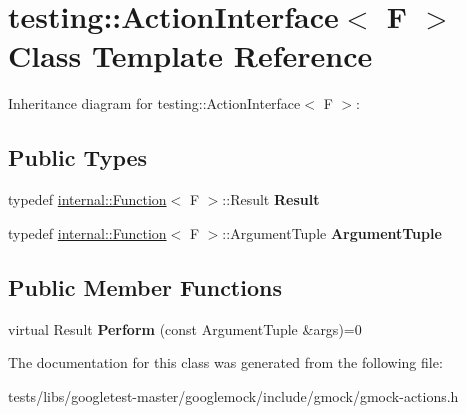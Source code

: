 \hypertarget{classtesting_1_1ActionInterface}{}\section{testing\+:\+:Action\+Interface$<$ F $>$ Class Template Reference}
\label{classtesting_1_1ActionInterface}


Inheritance diagram for testing\+:\+:Action\+Interface$<$ F $>$\+:
\subsection*{Public Types}
\begin{DoxyCompactItemize}
\item 
\mbox{\label{classtesting_1_1ActionInterface_a7477de2fe3e4e01c59db698203acaee7}} 
typedef \hyperlink{structtesting_1_1internal_1_1Function}{internal\+::\+Function}$<$ F $>$\+::Result {\bfseries Result}
\item 
\mbox{\label{classtesting_1_1ActionInterface_af72720d864da4d606629e83edc003511}} 
typedef \hyperlink{structtesting_1_1internal_1_1Function}{internal\+::\+Function}$<$ F $>$\+::Argument\+Tuple {\bfseries Argument\+Tuple}
\end{DoxyCompactItemize}
\subsection*{Public Member Functions}
\begin{DoxyCompactItemize}
\item 
\mbox{\label{classtesting_1_1ActionInterface_a20f8624fcea1786f2992b358760422a0}} 
virtual Result {\bfseries Perform} (const Argument\+Tuple \&args)=0
\end{DoxyCompactItemize}


The documentation for this class was generated from the following file\+:\begin{DoxyCompactItemize}
\item 
tests/libs/googletest-\/master/googlemock/include/gmock/gmock-\/actions.\+h\end{DoxyCompactItemize}
